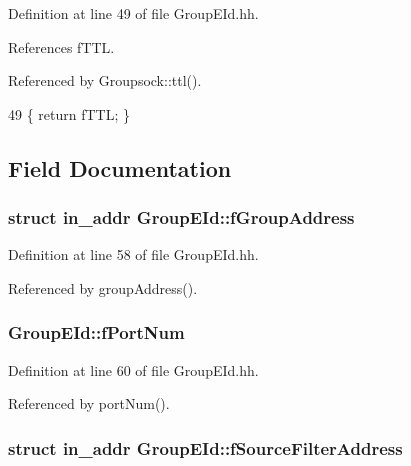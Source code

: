Definition at line 49 of file Group\+E\+Id.\+hh.



References f\+T\+T\+L.



Referenced by Groupsock\+::ttl().


\begin{DoxyCode}
49 \{ \textcolor{keywordflow}{return} fTTL; \}
\end{DoxyCode}


\subsection{Field Documentation}
\subsubsection[{f\+Group\+Address}]{\setlength{\rightskip}{0pt plus 5cm}struct in\+\_\+addr Group\+E\+Id\+::f\+Group\+Address\hspace{0.3cm}{\ttfamily [private]}}\label{classGroupEId_ab7594b800bdcb76995bb7660404e490d}


Definition at line 58 of file Group\+E\+Id.\+hh.



Referenced by group\+Address().

\subsubsection[{f\+Port\+Num}]{ Group\+E\+Id\+::f\+Port\+Num\hspace{0.3cm}{\ttfamily [private]}}\label{classGroupEId_a9215288eeab5e81d28b2e72dde010325}


Definition at line 60 of file Group\+E\+Id.\+hh.



Referenced by port\+Num().

\subsubsection[{f\+Source\+Filter\+Address}]{\setlength{\rightskip}{0pt plus 5cm}struct in\+\_\+addr Group\+E\+Id\+::f\+Source\+Filter\+Address\hspace{0.3cm}{\ttfamily [private]}}\label{classGroupEId_a9d98117f03b678ac4cb0f659126fa7f1}


